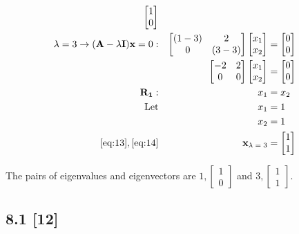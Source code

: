 \documentclass{article}
\begin{document}
\begin{align}
\begin{bmatrix}
    1\\0
    \end{bmatrix}
    \\
    \label{eq:10}
    \lambda = 3 \rightarrow (\textbf{A} - \lambda\textbf{I})\textbf{x}=0: && \begin{bmatrix}
    (1-3) & 2 \\
    0 & (3-3)
    \end{bmatrix} \begin{bmatrix}
    x_1\\x_2
    \end{bmatrix} &= \begin{bmatrix}
    0\\0
    \end{bmatrix}
    \\
    \label{eq:11} 
    && \begin{bmatrix}
    -2 & 2\\
    0 & 0
    \end{bmatrix} \begin{bmatrix}
    x_1 \\x_2
    \end{bmatrix} &= \begin{bmatrix}
    0\\0
    \end{bmatrix}
    \\
    \label{eq:12}
    \textbf{R\textsubscript{1}}: && x_1 &= x_2
    \\
    \label{eq:13}
    \text{Let} && x_1 &= 1
    \\
    \label{eq:14}
    && x_2 &= 1
    \\
    \label{eq:15}
    \eqref{eq:13}, \eqref{eq:14} && \textbf{x\textsubscript{$\lambda=3$}} &= \begin{bmatrix}
    1\\1
    \end{bmatrix}
\end{align}

The pairs of eigenvalues and eigenvectors are $1, \begin{bmatrix} 1\\0 \end{bmatrix}$ and $3, \begin{bmatrix} 1\\1 \end{bmatrix}$.

\subsection*{8.1 [12]}
\setcounter{equation}{0}
\end{document}
